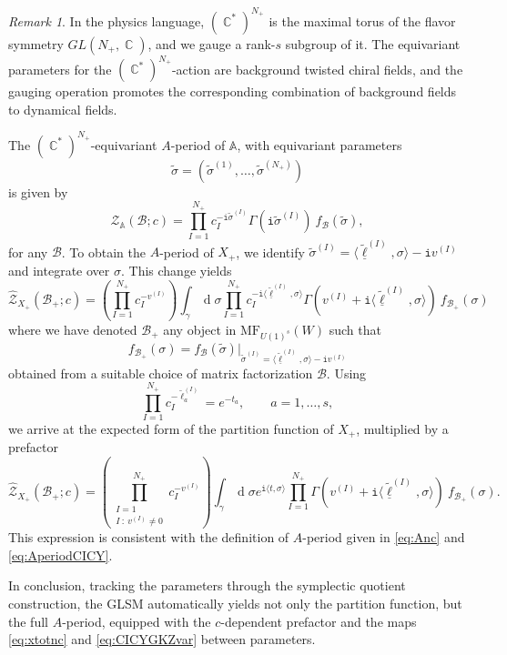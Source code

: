 \documentclass[12pt,a4paper,oneside]{amsart}
\numberwithin{equation}{section}
\theoremstyle{definition}
\theoremstyle{remark}
\newtheorem{rmk}[thm]{Remark}
\DeclareMathOperator{\C}{\mathbb{C}}
\DeclareMathOperator{\dd}{d}
\newcommand{\mz}{\mathcal{Z}}
\newcommand{\Br}{\mathcal{B}}
\newcommand{\pz}{\widehat{\mathcal{Z}}}
\newcommand{\ii}{\mathtt{i}}
\begin{document}
\begin{appendix}
\begin{rmk}
    In the physics language, $(\C^{\ast})^{N_+}$ is the maximal torus of the flavor symmetry $GL (N_+, \C)$, and we gauge a rank-$s$ subgroup of it. The equivariant parameters for the $(\C^{\ast})^{N_+}$-action are background twisted chiral fields, and the gauging operation promotes the corresponding combination of background fields to dynamical fields.
\end{rmk}\par
The $(\C^{\ast})^{N_+}$-equivariant $A$-period of $\mathbb{A}$, with equivariant parameters 
$$\tilde{\sigma}=(\tilde{\sigma}^{(1)}, \dots, \tilde{\sigma}^{(N_+)})$$ 
is given by 
\begin{equation*}
    \mz_{\mathbb{A}} (\Br; c) = \prod_{I=1}^{N_+} c_I^{- \ii \tilde{\sigma}^{(I)}} \Gamma \left( \ii \tilde{\sigma}^{(I)} \right) ~f_{\Br} (\tilde{\sigma}) ,
\end{equation*}
for any $\Br$. To obtain the $A$-period of $X_+$, we identify $\tilde{\sigma}^{(I)}= \langle \tilde{\underline{\ell}}^{(I)} , \sigma \rangle - \ii v^{(I)}$ and integrate over $\sigma$. This change yields
\begin{equation*}
    \pz_{X_+} (\Br_+ ; c) = \left( \prod_{I=1}^{N_+} c_I^{-v^{(I)}} \right) \int_{\gamma} \dd \sigma \prod_{I=1}^{N_+} c_I^{- \ii \langle \tilde{\underline{\ell}}^{(I)} , \sigma \rangle} \Gamma \left( v^{(I)} + \ii\langle \tilde{\underline{\ell}}^{(I)} , \sigma \rangle \right) ~f_{\Br_+} (\sigma)
\end{equation*}
where we have denoted $\Br_+ $ any object in $ \mathrm{MF}_{U(1)^s} (W)$ such that 
\begin{equation*}
    f_{\Br_+} (\sigma) = f_{\Br} (\tilde{\sigma})\Big\vert_{\tilde{\sigma}^{(I)} = \langle \tilde{\underline{\ell}}^{(I)} , \sigma \rangle - \ii v^{(I)}}
\end{equation*}
obtained from a suitable choice of matrix factorization $\Br$. Using  
\begin{equation*}
     \prod_{I=1}^{N_+}c_I^{-  \tilde{\ell}_a^{(I)}} = e^{-t_a} , \qquad a=1, \dots, s ,
\end{equation*}
we arrive at the expected form of the partition function of $X_+$, multiplied by a prefactor 
\begin{equation*}
    \pz_{X_+} (\Br_+ ; c) = \left( \prod_{\substack{I=1 \\ I \ : \ v^{(I)} \ne 0 }}^{N_+} c_I^{-v^{(I)}} \right) \int_{\gamma} \dd \sigma e^{\ii \langle t , \sigma \rangle} \prod_{I=1}^{N_+} \Gamma \left( v^{(I)} + \ii\langle \tilde{\underline{\ell}}^{(I)} , \sigma \rangle \right) ~f_{\Br_+} (\sigma) .
\end{equation*}
This expression is consistent with the definition of $A$-period given in \eqref{eq:Anc} and \eqref{eq:AperiodCICY}.\par
In conclusion, tracking the parameters through the symplectic quotient construction, the GLSM automatically yields not only the partition function, but the full $A$-period, equipped with the $c$-dependent prefactor and the maps \eqref{eq:xtotnc} and \eqref{eq:CICYGKZvar} between parameters.




\end{appendix}

\end{document}
